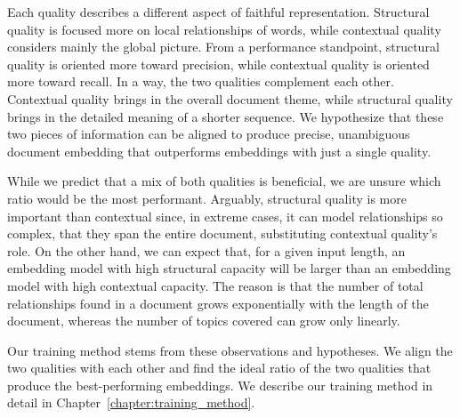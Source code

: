 
Each quality describes a different aspect of faithful representation.
Structural quality is focused more on local relationships of words, while
contextual quality considers mainly the global picture. From a performance
standpoint, structural quality is oriented more toward precision, while
contextual quality is oriented more toward recall. In a way, the two qualities
complement each other. Contextual quality brings in the overall document theme,
while structural quality brings in the detailed meaning of a shorter sequence.
We hypothesize that these two pieces of information can be aligned to produce
precise, unambiguous document embedding that outperforms embeddings
with just a single quality.

While we predict that a mix of both qualities is beneficial, we are unsure
which ratio would be the most performant. Arguably, structural quality is more
important than contextual since, in extreme cases, it can model relationships
so complex, that they span the entire document, substituting contextual
quality’s role. On the other hand, we can expect that, for a given input
length, an embedding model with high structural capacity will be larger than an
embedding model with high contextual capacity. The reason is that the number of
total relationships found in a document grows exponentially with the length of
the document, whereas the number of topics covered can grow only linearly.

Our training method stems from these observations and hypotheses. We align the
two qualities with each other and find the ideal ratio of the two qualities
that produce the best-performing embeddings. We describe our training method
in detail in Chapter~\ref{chapter:training_method}.
